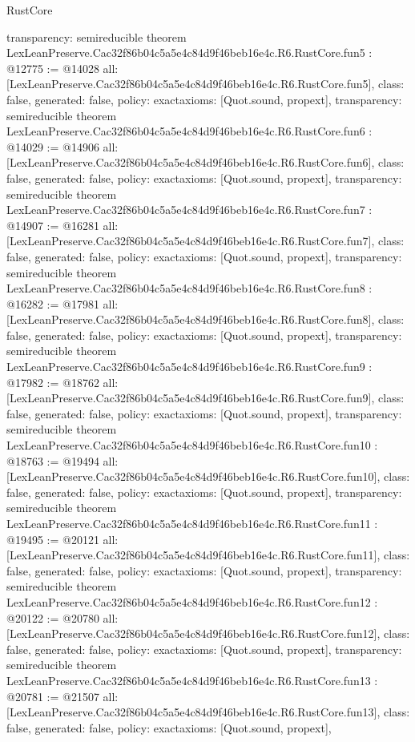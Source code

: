 \begin{lexlean}{RustCore}
\begin{coremodule}
{  transparency: semireducible
}
theorem LexLeanPreserve.Cac32f86b04c5a5e4c84d9f46beb16e4c.R6.RustCore.fun5 : @12775 := @14028 {
  all: [LexLeanPreserve.Cac32f86b04c5a5e4c84d9f46beb16e4c.R6.RustCore.fun5],
  class: false,
  generated: false,
  policy: exact{axioms: [Quot.sound, propext]},
  transparency: semireducible
}
theorem LexLeanPreserve.Cac32f86b04c5a5e4c84d9f46beb16e4c.R6.RustCore.fun6 : @14029 := @14906 {
  all: [LexLeanPreserve.Cac32f86b04c5a5e4c84d9f46beb16e4c.R6.RustCore.fun6],
  class: false,
  generated: false,
  policy: exact{axioms: [Quot.sound, propext]},
  transparency: semireducible
}
theorem LexLeanPreserve.Cac32f86b04c5a5e4c84d9f46beb16e4c.R6.RustCore.fun7 : @14907 := @16281 {
  all: [LexLeanPreserve.Cac32f86b04c5a5e4c84d9f46beb16e4c.R6.RustCore.fun7],
  class: false,
  generated: false,
  policy: exact{axioms: [Quot.sound, propext]},
  transparency: semireducible
}
theorem LexLeanPreserve.Cac32f86b04c5a5e4c84d9f46beb16e4c.R6.RustCore.fun8 : @16282 := @17981 {
  all: [LexLeanPreserve.Cac32f86b04c5a5e4c84d9f46beb16e4c.R6.RustCore.fun8],
  class: false,
  generated: false,
  policy: exact{axioms: [Quot.sound, propext]},
  transparency: semireducible
}
theorem LexLeanPreserve.Cac32f86b04c5a5e4c84d9f46beb16e4c.R6.RustCore.fun9 : @17982 := @18762 {
  all: [LexLeanPreserve.Cac32f86b04c5a5e4c84d9f46beb16e4c.R6.RustCore.fun9],
  class: false,
  generated: false,
  policy: exact{axioms: [Quot.sound, propext]},
  transparency: semireducible
}
theorem LexLeanPreserve.Cac32f86b04c5a5e4c84d9f46beb16e4c.R6.RustCore.fun10 : @18763 := @19494 {
  all: [LexLeanPreserve.Cac32f86b04c5a5e4c84d9f46beb16e4c.R6.RustCore.fun10],
  class: false,
  generated: false,
  policy: exact{axioms: [Quot.sound, propext]},
  transparency: semireducible
}
theorem LexLeanPreserve.Cac32f86b04c5a5e4c84d9f46beb16e4c.R6.RustCore.fun11 : @19495 := @20121 {
  all: [LexLeanPreserve.Cac32f86b04c5a5e4c84d9f46beb16e4c.R6.RustCore.fun11],
  class: false,
  generated: false,
  policy: exact{axioms: [Quot.sound, propext]},
  transparency: semireducible
}
theorem LexLeanPreserve.Cac32f86b04c5a5e4c84d9f46beb16e4c.R6.RustCore.fun12 : @20122 := @20780 {
  all: [LexLeanPreserve.Cac32f86b04c5a5e4c84d9f46beb16e4c.R6.RustCore.fun12],
  class: false,
  generated: false,
  policy: exact{axioms: [Quot.sound, propext]},
  transparency: semireducible
}
theorem LexLeanPreserve.Cac32f86b04c5a5e4c84d9f46beb16e4c.R6.RustCore.fun13 : @20781 := @21507 {
  all: [LexLeanPreserve.Cac32f86b04c5a5e4c84d9f46beb16e4c.R6.RustCore.fun13],
  class: false,
  generated: false,
  policy: exact{axioms: [Quot.sound, propext]},
}
\end{coremodule}
\end{lexlean}
